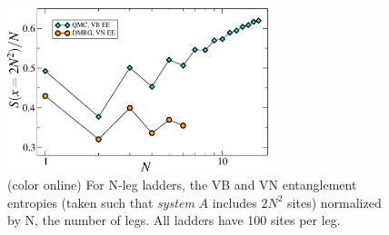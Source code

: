 \documentclass[prl,aps,twocolumn,floatfix,amsmath,amssymb,superscriptaddress,tightenlines]{revtex4}
\begin{document}
\begin{figure}
{
\includegraphics[width=3in]{fig4.eps}
\caption{(color online) For N-leg ladders, the VB and VN entanglement entropies (taken such that {\it system} $A$ includes $2N^2$ sites) normalized by N, the number of legs.  All ladders have 100 sites per leg.
\label{S(x)/x}}}
\end{figure}


\end{document}
